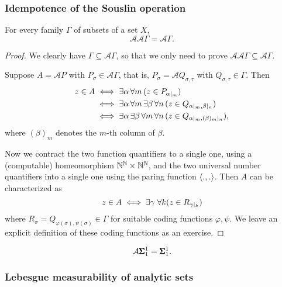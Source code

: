 \subsubsection{Idempotence of the Souslin operation}

\begin{theorem}\label{thm-idempotent-souslin}For every family $\Gamma$ of subsets of a set $X$,
\begin{equation*}
\mathcal{A} \mathcal{A} \Gamma = \mathcal{A} \Gamma.
\end{equation*}
\end{theorem}\begin{proof}We clearly have  $\Gamma \subseteq  \mathcal{A} \Gamma$, so that we only need to prove $\mathcal{A} \mathcal{A} \Gamma \subseteq \mathcal{A} \Gamma$.

Suppose $A = \mathcal{A} P$ with $P_\sigma \in \mathcal{A} \Gamma$, that is, $P_\sigma = \mathcal{A} Q_{\sigma,\tau}$ with $Q_{\sigma,\tau} \in  \Gamma$. Then
\begin{align*}
z \in A & \iff  \exists \alpha  \, \forall m \, (z \in P_{\alpha\mid_{m}})\\
    & \iff  \exists \alpha \, \forall m \, \exists \beta \, \forall n \, (z \in Q_{\alpha\mid_{m},\beta\mid_{n} })\\
    &\iff  \exists \alpha \,  \exists \beta \, \forall m \, \forall n \, (z \in Q_{\alpha\mid_{m},(\beta)_m\mid_{n}}),
\end{align*}
where $(\beta)_m$ denotes the $m$-th column of $\beta$.

Now we contract the two function quantifiers to a single one, using a (computable) homeomorphism $\mathbb{N}^{\mathbb{N}} \times \mathbb{N}^{\mathbb{N}}$, and the two universal number quantifiers into a single one using the paring function $\langle .,. \rangle$. Then $A$ can be characterized as
\begin{equation*}
z \in A \iff \exists \gamma  \; \forall k (z \in R_{\gamma\mid_{k}})
\end{equation*}
where $R_\sigma = Q_{\varphi(\sigma), \psi(\sigma)} \in \Gamma$ for suitable coding functions $\varphi, \psi$. We leave an explicit definition of these coding functions as an exercise.

\end{proof}\begin{corollary}\label{cor-analytic-souslin-closed}\begin{equation}
\mathcal{A}\pmb{\Sigma}^{1}_{1} = \pmb{\Sigma}^{1}_{1}.
\end{equation}

\end{corollary}\subsubsection{Lebesgue measurability of analytic sets}

